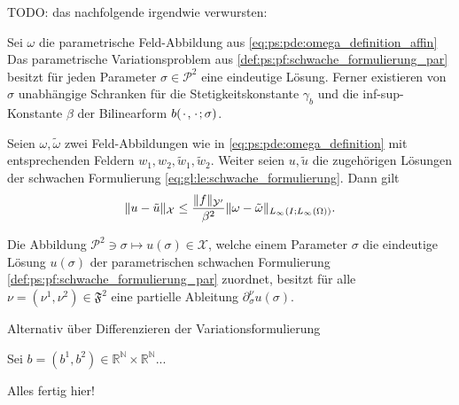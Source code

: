 TODO: das nachfolgende irgendwie verwursten:

\begin{Satz}
    Sei $\omega$ die parametrische Feld-Abbildung aus \cref{eq:ps:pde:omega_definition_affin}
    Das parametrische Variationsproblem aus \cref{def:ps:pf:schwache_formulierung_par} besitzt für jeden Parameter $\sigma \in \mathcal P^{2}$ eine eindeutige Lösung.
    Ferner existieren von $\sigma$ unabhängige Schranken für die Stetigkeitskonstante $\gamma_{b}$ und die inf-sup-Konstante $\beta$ der Bilinearform $b({\mkern2mu\cdot\mkern2mu}, {\mkern2mu\cdot\mkern2mu}; \sigma)$.

    \begin{Beweis}

    \end{Beweis}
\end{Satz}

\begin{Lemma}
    Seien $\omega, \tilde{\omega}$ zwei Feld-Abbildungen wie in \cref{eq:ps:pde:omega_definition} mit entsprechenden Feldern $w_{1}, w_{2}, \tilde{w}_{1}, \tilde{w}_{2}$.
    Weiter seien $u, \tilde{u}$ die zugehörigen Lösungen der schwachen Formulierung \cref{eq:gl:le:schwache_formulierung}.
    Dann gilt
    \begin{equation}
        \lVert u - \tilde{u}\rVert_{\mathcal X} \leq \frac{\lVert f\rVert_{\mathcal Y'}}{\beta^{2}} \lVert\omega - \tilde{\omega}\rVert_{L_{\infty}(I; L_{\infty}(\Omega))}.
    \end{equation}
\end{Lemma}

\begin{Satz}
    Die Abbildung $\mathcal P^{2} \ni \sigma \mapsto u(\sigma) \in \mathcal X$, welche einem Parameter $\sigma$ die eindeutige Lösung $u(\sigma)$ der parametrischen schwachen Formulierung \cref{def:ps:pf:schwache_formulierung_par} zuordnet, besitzt für alle $\nu = (\nu^{1}, \nu^{2}) \in \mathfrak F^{2}$ eine partielle Ableitung $\partial^{\nu}_{\sigma} u(\sigma)$.
\end{Satz}

\begin{Bemerkung}
    Alternativ über Differenzieren der Variationsformulierung
\end{Bemerkung}

\begin{Satz}
    Sei $b = (b^{1}, b^{2}) \in \mathbb{R}^{\mathbb{N}} \times \mathbb{R}^{\mathbb{N}}$...
\end{Satz}

\begin{Satz}
    Alles fertig hier!
\end{Satz}


